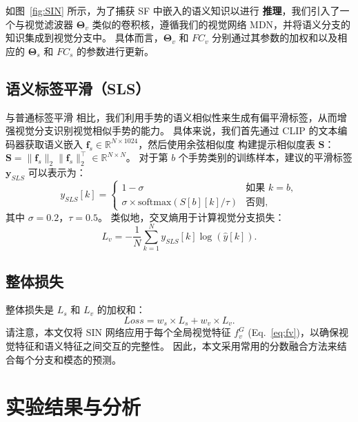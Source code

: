 如图~\ref{fig:SIN} 所示，为了捕获 SF 中嵌入的语义知识以进行 \textbf{推理}，我们引入了一个与视觉滤波器 $\boldsymbol{\Theta}_{v}$ 类似的卷积核，遵循我们的视觉网络 MDN，并将语义分支的知识集成到视觉分支中。
具体而言，$\boldsymbol{\Theta}_{v}$ 和 $FC_{v}$ 分别通过其参数的加权和以及相应的 $\boldsymbol{\Theta}_{s}$ 和 $FC_{s}$ 的参数进行更新。

\subsection{语义标签平滑（SLS）}
与普通标签平滑 \cite{he2019bag} 相比，我们利用手势的语义相似性来生成有偏平滑标签，从而增强视觉分支识别视觉相似手势的能力。
具体来说，我们首先通过 CLIP 的文本编码器获取语义嵌入 $\mathbf{f}_{s} \in \mathbb{R}^{N\times 1024}$，然后使用余弦相似度 \cite{zuo2023natural} 构建提示相似度表 $\mathbf{S}$：$\mathbf{S} = \|\mathbf{f}_{s}\|_2\|\mathbf{f}_{s}\|_2^{\top} \in \mathbb{R}^{N\times N}$。
%
对于第 $b$ 个手势类别的训练样本，建议的平滑标签 $\mathbf{y}_{SLS}$ 可以表示为：
\begin{equation}
y_{SLS}[k] = \begin{cases}
1 - \sigma & \text{如果 } k = b,\\
\sigma \times \text{softmax}\left(S[b][k]/\tau\right) & \text{否则},
\end{cases}
\end{equation}
其中 $\sigma=0.2$，$\tau=0.5$。
类似地，交叉熵用于计算视觉分支损失：
\begin{equation}
L_{v} = -\frac{1}{N}\sum_{k=1}^{N}{y_{SLS}[k]\log\left(\hat{y}[k]\right)}. %
\end{equation}

\subsection{整体损失}
整体损失是 $L_{s}$ 和 $L_{v}$ 的加权和：
\begin{equation}
Loss = w_{s} \times L_{s} + w_{v} \times L_{v}.
\label{eq:overall_loss}
\end{equation}
%
请注意，本文仅将 SIN 网络应用于每个全局视觉特征 $f_v^G$ (Eq.~\ref{eq:fv})，以确保视觉特征和语义特征之间交互的完整性。
因此，本文采用常用的分数融合方法来结合每个分支和模态的预测。

\section{实验结果与分析}
\label{sec:GR_EXP}
